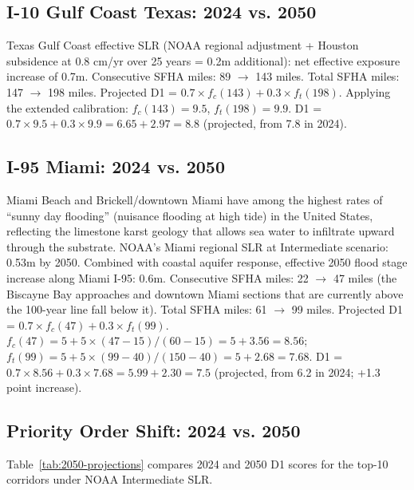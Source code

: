 \subsection{I-10 Gulf Coast Texas: 2024 vs. 2050}

Texas Gulf Coast effective SLR (NOAA regional adjustment + Houston subsidence at 0.8
cm/yr over 25 years = 0.2m additional): net effective exposure increase of 0.7m.
Consecutive SFHA miles: 89 $\to$ 143 miles. Total SFHA miles: 147 $\to$ 198 miles.
Projected D1 = $0.7 \times f_c(143) + 0.3 \times f_t(198)$. Applying the extended
calibration: $f_c(143) = 9.5$, $f_t(198) = 9.9$. D1 = $0.7 \times 9.5 + 0.3 \times
9.9 = 6.65 + 2.97 = 8.8$ (projected, from 7.8 in 2024).

\subsection{I-95 Miami: 2024 vs. 2050}

Miami Beach and Brickell/downtown Miami have among the highest rates of ``sunny day
flooding'' (nuisance flooding at high tide) in the United States, reflecting the
limestone karst geology that allows sea water to infiltrate upward through the substrate.
NOAA's Miami regional SLR at Intermediate scenario: 0.53m by 2050. Combined with coastal
aquifer response, effective 2050 flood stage increase along Miami I-95: 0.6m. Consecutive
SFHA miles: 22 $\to$ 47 miles (the Biscayne Bay approaches and downtown Miami sections
that are currently above the 100-year line fall below it). Total SFHA miles: 61 $\to$
99 miles. Projected D1 = $0.7 \times f_c(47) + 0.3 \times f_t(99)$.
$f_c(47) = 5 + 5 \times (47-15)/(60-15) = 5 + 3.56 = 8.56$; $f_t(99) = 5 + 5 \times
(99-40)/(150-40) = 5 + 2.68 = 7.68$. D1 = $0.7 \times 8.56 + 0.3 \times 7.68 = 5.99 +
2.30 = 7.5$ (projected, from 6.2 in 2024; +1.3 point increase).

\subsection{Priority Order Shift: 2024 vs. 2050}

Table~\ref{tab:2050-projections} compares 2024 and 2050 D1 scores for the top-10
corridors under NOAA Intermediate SLR.

